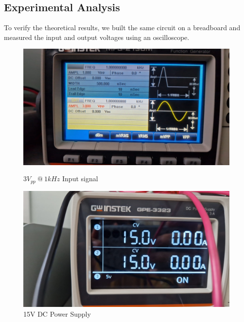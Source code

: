 \newpage
\thispagestyle{plain}

\subsection{Experimental Analysis}

To verify the theoretical results, we built the same circuit on a breadboard and measured the input and output voltages using an oscilloscope.

\begin{figure}[h]
    \centering
    \begin{minipage}{.5\textwidth}
        \includegraphics[width=1\linewidth]{assets/p1-result-experimet-signal.png}
        \caption{$3V_ {pp}~@~1kHz$ Input signal}
        \label{fig:p1-result-experiment-signal}
    \end{minipage}%
    \begin{minipage}{.5\textwidth}
        \includegraphics[width=1\linewidth]{assets/pm-15v.png}
        \caption{15V DC Power Supply}
        \label{fig:experiment-15v-power}
    \end{minipage}
\end{figure}

